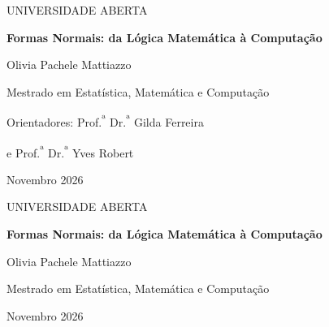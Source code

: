 \documentclass[12pt,a4paper,oneside]{report}
\theoremstyle{tituloplain}
\theoremstyle{titulodef}
\newcommand{\UAbUniversity}{UNIVERSIDADE ABERTA}
\newcommand{\DocTitle}{Formas Normais: da Lógica Matemática à Computação}
\newcommand{\AuthorName}{Olivia Pachele Mattiazzo}
\newcommand{\DegreeName}{Mestrado em Estatística, Matemática e Computação}
\newcommand{\OrientadorUm}{Prof.\textsuperscript{ª} Dr.\textsuperscript{ª} Gilda Ferreira}
\newcommand{\OrientadorDois}{Prof.\textsuperscript{ª} Dr.\textsuperscript{ª} Yves Robert}
\newcommand{\DocMonthYear}{Novembro 2026}
\begin{document}
\begin{titlepage}
  \thispagestyle{empty}
  \begin{center}
    {\Large \UAbUniversity \par}
    \vspace{2.5cm}
    {\Large \textbf{\DocTitle}\par}
    \vspace{0.5cm}
    {\Large \AuthorName\par}
    \vspace{0.8cm}
    {\Large \DegreeName\par}
    \vspace{1.2cm}
    {\large Orientadores: \OrientadorUm\par}
    {\large e \OrientadorDois\par}
    \vfill
    {\Large \DocMonthYear\par}
  \end{center}
\end{titlepage}

\begin{titlepage}
  \thispagestyle{empty}
  \begin{center}
    {\Large \UAbUniversity \par}
    \vspace{2.5cm}
    {\Large \textbf{\DocTitle}\par}
    \vspace{0.5cm}
    {\Large \AuthorName\par}
    \vspace{0.8cm}
    {\Large \DegreeName\par}
    \vfill
    {\Large \DocMonthYear\par}
  \end{center}
\end{titlepage}

\setcounter{page}{2} 

\end{document}
